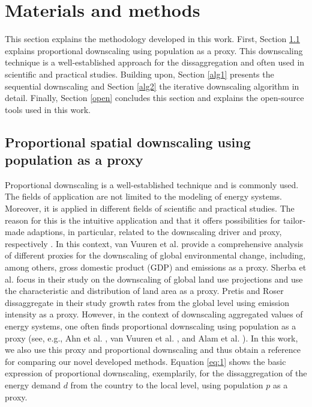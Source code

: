 \section{Materials and methods}\label{methodology}
This section explains the methodology developed in this work. First, Section \ref{pop} explains proportional downscaling using population as a proxy. This downscaling technique is a well-established approach for the dissaggregation and often used in scientific and practical studies. Building upon, Section \ref{alg1} presents the sequential downscaling and Section \ref{alg2} the iterative downscaling algorithm in detail. Finally, Section \ref{open} concludes this section and explains the open-source tools used in this work.

\subsection{Proportional spatial downscaling using population as a proxy}\label{pop}
Proportional downscaling is a well-established technique and is commonly used. The fields of application are not limited to the modeling of energy systems. Moreover, it is applied in different fields of scientific and practical studies. The reason for this is the intuitive application and that it offers possibilities for tailor-made adaptions, in particular, related to the downscaling driver and proxy, respectively \cite{van2006downscaling}. In this context, van Vuuren et al. \cite{van2006downscaling} provide a comprehensive analysis of different proxies for the downscaling of global environmental change, including, among others, gross domestic product (GDP) and emissions as a proxy. Sherba et al. \cite{sherba2015downscaling} focus in their study on the downscaling of global land use projections and use the characteristic and distribution of land area as a proxy. Pretis and Roser \cite{pretis2017carbon} dissaggregate in their study growth rates from the global level using emission intensity as a proxy. However, in the context of downscaling aggregated values of energy systems, one often finds proportional downscaling using population as a proxy (see, e.g., Ahn et al. \cite{ahn2019downscaled}, van Vuuren et al. \cite{van2010downscaling}, and Alam et al. \cite{alam2018downscaling}). In this work, we also use this proxy and proportional downscaling and thus obtain a reference for comparing our novel developed methods. Equation \ref{eq:1} shows the basic expression of proportional downscaling, exemplarily, for the dissaggregation of the energy demand $d$ from the country to the local level, using population $p$ as a proxy. 
